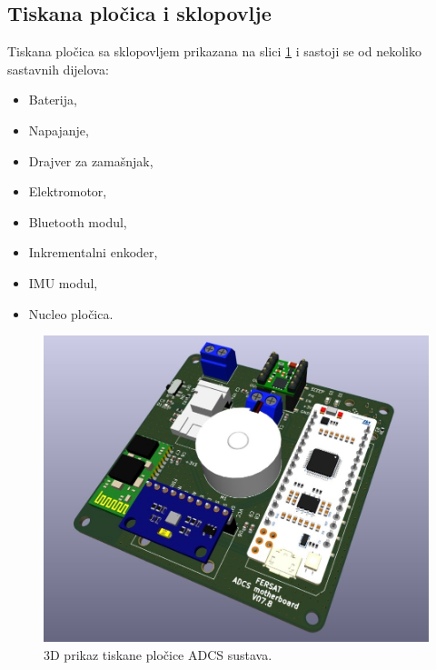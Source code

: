 \documentclass[times, utf8, diplomski, numeric]{templates/template}
\begin{document}
{{        \subsection{Tiskana pločica i sklopovlje}{
            Tiskana pločica sa sklopovljem prikazana na slici \ref{fig:plocica_3d} i sastoji se od nekoliko sastavnih dijelova:

            \begin{itemize}
            \item Baterija,
            \item Napajanje,
            \item Drajver za zamašnjak,
            \item Elektromotor,
            \item Bluetooth modul,
            \item Inkrementalni enkoder,
            \item IMU modul,
            \item Nucleo pločica.
            \end{itemize}

            \begin{figure}[htb]
            \centering
            \includegraphics[width=1.0\textwidth]{images/plocica_3d.jpg}
            \caption{3D prikaz tiskane pločice ADCS sustava.}
            \label{fig:plocica_3d}
            \end{figure}

}}}
\end{document}
